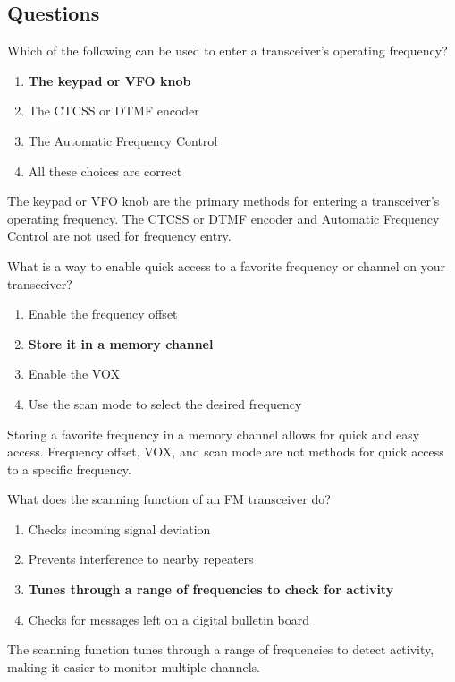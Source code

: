 \subsection*{Questions}
\begin{tcolorbox}[colback=gray!10!white,colframe=black!75!black,title={T4B02}]
    Which of the following can be used to enter a transceiver’s operating frequency?
    \begin{enumerate}[label=\Alph*),noitemsep]
        \item \textbf{The keypad or VFO knob}
        \item The CTCSS or DTMF encoder
        \item The Automatic Frequency Control
        \item All these choices are correct
    \end{enumerate}
\end{tcolorbox}
The keypad or VFO knob are the primary methods for entering a transceiver's operating frequency. The CTCSS or DTMF encoder and Automatic Frequency Control are not used for frequency entry.


\begin{tcolorbox}[colback=gray!10!white,colframe=black!75!black,title={T4B04}]
    What is a way to enable quick access to a favorite frequency or channel on your transceiver?
    \begin{enumerate}[label=\Alph*),noitemsep]
        \item Enable the frequency offset
        \item \textbf{Store it in a memory channel}
        \item Enable the VOX
        \item Use the scan mode to select the desired frequency
    \end{enumerate}
\end{tcolorbox}
Storing a favorite frequency in a memory channel allows for quick and easy access. Frequency offset, VOX, and scan mode are not methods for quick access to a specific frequency.


\begin{tcolorbox}[colback=gray!10!white,colframe=black!75!black,title={T4B05}]
    What does the scanning function of an FM transceiver do?
    \begin{enumerate}[label=\Alph*),noitemsep]
        \item Checks incoming signal deviation
        \item Prevents interference to nearby repeaters
        \item \textbf{Tunes through a range of frequencies to check for activity}
        \item Checks for messages left on a digital bulletin board
    \end{enumerate}
\end{tcolorbox}
The scanning function tunes through a range of frequencies to detect activity, making it easier to monitor multiple channels.

